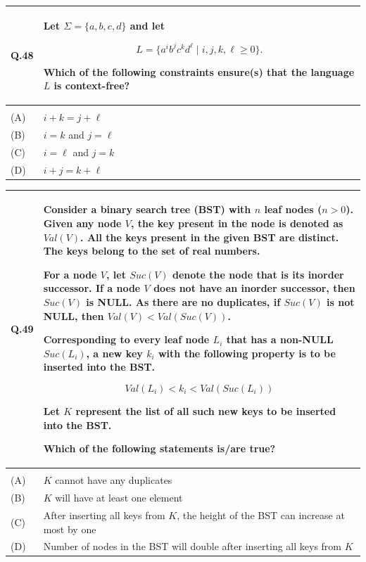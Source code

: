 \documentclass[14pt]{article}
\begin{document}
\begin{tabular}{|p{1.5cm}|p{12cm}|}
\hline
Q.48 &
\parbox[t]{\linewidth}{
Let $\Sigma=\{a,b,c,d\}$ and let

\[
L=\{a^i b^j c^k d^\ell \mid i,j,k,\ell \ge 0\}.
\]

Which of the following constraints ensure(s) that the language $L$ is
context-free?

\rule{0pt}{0.8cm}
}
\\
\hline
& \\
\hline
(A) & $i+k=j+\ell$ \\
\hline
(B) & $i=k$ and $j=\ell$ \\
\hline
(C) & $i=\ell$ and $j=k$ \\
\hline
(D) & $i+j=k+\ell$ \\
\hline
\end{tabular}

\vspace{0.3cm}

\begin{tabular}{|p{1.5cm}|p{12cm}|}
\hline
Q.49 &
\parbox[t]{\linewidth}{
Consider a binary search tree (BST) with $n$ leaf nodes ($n>0$). Given any node $V$, the key present in the node is denoted as $Val(V)$. All the keys present in the given BST are distinct. The keys belong to the set of real numbers.

\vspace{0.2cm}

For a node $V$, let $Suc(V)$ denote the node that is its inorder successor. If a node $V$ does not have an inorder successor, then $Suc(V)$ is NULL. As there are no duplicates, if $Suc(V)$ is not NULL, then $Val(V)<Val(Suc(V))$.

\vspace{0.2cm}

Corresponding to every leaf node $L_i$ that has a non-NULL $Suc(L_i)$, a new key $k_i$ with the following property is to be inserted into the BST.

\[
Val(L_i)<k_i<Val(Suc(L_i))
\]

Let $K$ represent the list of all such new keys to be inserted into the BST.

\vspace{0.2cm}

Which of the following statements is/are true?
}
\\
\hline
& \\
\hline
(A) & $K$ cannot have any duplicates \\
\hline
(B) & $K$ will have at least one element \\
\hline
(C) & After inserting all keys from $K$, the height of the BST can increase at most by one \\
\hline
(D) & Number of nodes in the BST will double after inserting all keys from $K$ \\
\hline
\end{tabular}
\end{document}
